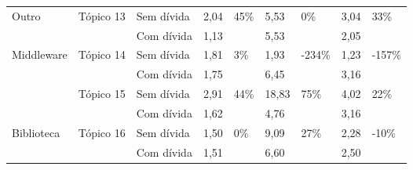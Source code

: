\begin{longtable}{|l|l|l|l|l|l|l|l|l|}
\multirow{2}{*}{Outro}         & \multirow{2}{*}{Tópico 13} & Sem dívida              & 2,04            & \multirow{2}{*}{45\%}   & 5,53            & \multirow{2}{*}{0\%}     & 3,04            & \multirow{2}{*}{33\%}   \\ \cline{3-4} \cline{6-6} \cline{8-8}
                               &                            & Com dívida           & 1,13            &                         & 5,53            &                          & 2,05            &                         \\ \hline
\multirow{2}{*}{Middleware}    & \multirow{2}{*}{Tópico 14} & Sem dívida              & 1,81            & \multirow{2}{*}{3\%}    & 1,93            & \multirow{2}{*}{-234\%}  & 1,23            & \multirow{2}{*}{-157\%} \\ \cline{3-4} \cline{6-6} \cline{8-8}
                               &                            & Com dívida           & 1,75            &                         & 6,45            &                          & 3,16            &                         \\ \hline
                               
\newpage
\hline
\multirow{2}{*}{Biblioteca}    & \multirow{2}{*}{Tópico 15} & Sem dívida              & 2,91            & 44\%                    & 18,83           & \multirow{2}{*}{75\%}    & 4,02            & \multirow{2}{*}{22\%}   \\ \cline{3-6} \cline{8-8}
                               &                            & Com dívida           & 1,62            &                         & 4,76            &                          & 3,16            &                         \\ \hline
\multirow{2}{*}{Biblioteca}    & \multirow{2}{*}{Tópico 16} & Sem dívida              & 1,50            & \multirow{2}{*}{0\%}    & 9,09            & \multirow{2}{*}{27\%}    & 2,28            & \multirow{2}{*}{-10\%}  \\ \cline{3-4} \cline{6-6} \cline{8-8}
                               &                            & Com dívida           & 1,51            &                         & 6,60            &                          & 2,50            &                         \\ \hline


\end{longtable}
